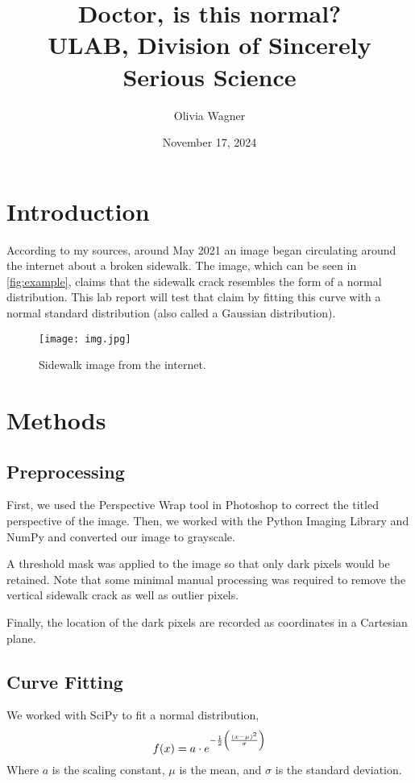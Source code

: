\documentclass{article}
\title{Doctor, is this normal? \\ \large ULAB, Division of Sincerely Serious Science}
\author{Olivia Wagner}
\date{November 17, 2024}
\begin{document}
\maketitle

\section{Introduction}
According to my sources, around May 2021 an image began circulating around the internet about a broken sidewalk. The image, which can be seen in \autoref{fig:example}, claims that the sidewalk crack resembles the form of a normal distribution. This lab report will test that claim by fitting this curve with a normal standard distribution (also called a Gaussian distribution).

\begin{figure}[h!]
    \centering
    \texttt{[image: img.jpg]}
    \caption{Sidewalk image from the internet.}
    \label{fig:example}
\end{figure}

\section{Methods}
\subsection{Preprocessing}
First, we used the Perspective Wrap tool in Photoshop to correct the titled perspective of the image. Then, we worked with the Python Imaging Library and NumPy \cite{2020SciPy-NMeth} and converted our image to grayscale.

A threshold mask was applied to the image so that only dark pixels would be retained. Note that some minimal manual processing was required to remove the vertical sidewalk crack as well as outlier pixels.

Finally, the location of the dark pixels are recorded as coordinates in a Cartesian plane.
\subsection{Curve Fitting}
We worked with SciPy \cite{2020NumPy-Array} to fit a normal distribution,
\begin{equation}
f(x) = a \cdot e^{-\frac{1}{2} \left( \frac{(x - \mu)^2}{\sigma} \right)} \hfill
\label{eq:curve_fitting}
\end{equation}
Where $a$ is the scaling constant, $\mu$ is the mean, and $\sigma$ is the standard deviation.
\end{document}
